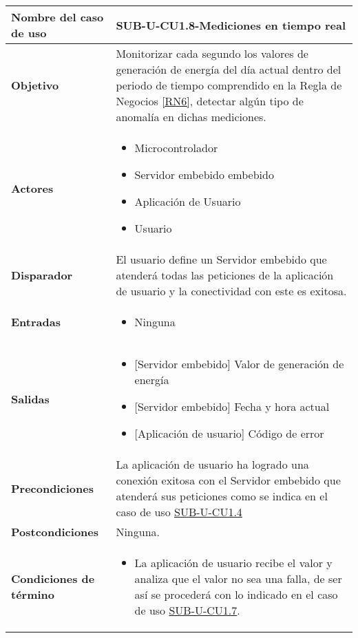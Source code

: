 \begin{longtable}{|J{5cm}|J{10.3cm}|}
	\hline
	\textbf{Nombre del caso de uso} &
		SUB-U-CU1.8-Mediciones en tiempo real \\ \hline
	\textbf{Objetivo} &
		Monitorizar cada segundo los valores de generación de energía del día actual dentro del periodo de tiempo comprendido en la Regla de Negocios \ref{RN6}, detectar algún tipo de anomalía en dichas mediciones. \\ \hline
	\textbf{Actores} &
		\begin{itemize}
		    \item Microcontrolador
			\item Servidor embebido embebido
			\item Aplicación de Usuario
		    \item Usuario
		\end{itemize} \\ \hline
	\textbf{Disparador} & 
	    El usuario define un Servidor embebido que atenderá todas las peticiones de la aplicación de usuario y la conectividad con este es exitosa.\\ \hline 
	\textbf{Entradas} & 
		\begin{itemize}
				\item Ninguna
		\end{itemize}\\ \hline 
	\textbf{Salidas} & 
		\begin{itemize}
			\item{[Servidor embebido]} Valor de generación de energía
			\item{[Servidor embebido]} Fecha y hora actual
			\item{[Aplicación de usuario]} Código de error
		\end{itemize} \\ \hline
	\textbf{Precondiciones} &
		La aplicación de usuario ha logrado una conexión exitosa con el Servidor embebido que atenderá sus peticiones como se indica en el caso de uso \hyperref[SUB-U-CU1.4]{SUB-U-CU1.4} \\ \hline
	\textbf{Postcondiciones} &
		Ninguna.\\ \hline
	\textbf{Condiciones de término} & 
		\begin{itemize}
			\item La aplicación de usuario recibe el valor y analiza que el valor no sea una falla, de ser así se procederá con lo indicado en el caso de uso \hyperref[SUB-U-CU1.7]{SUB-U-CU1.7}.
		\end{itemize} \\ \hline 

\end{longtable}
